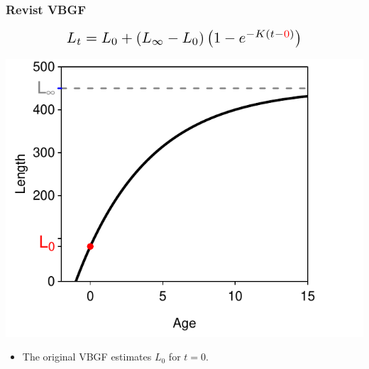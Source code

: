 \documentclass[xcolor=dvipsnames]{beamer}\usepackage[]{graphicx}\usepackage[]{color}
\makeatletter
\newenvironment{knitrout}{}{} %
\newcommand*{\Scale}[2][4]{\scalebox{#1}{\ensuremath{#2}}}%
\def\mathcolor#1#{\@mathcolor{#1}}
\def\@mathcolor#1#2#3{%
  \protect\leavevmode
  \begingroup
    \color#1{#2}#3%
  \endgroup
}
\makeatother
\begin{document}
\begin{frame}
\frametitle{Revist VBGF}
\vspace{-14pt}
\[\Scale[1.5]{ L_{t} = L_{0} + (L_{\infty}-L_{0})\left(1-e^{-K(t-\mathcolor{red}{0})}\right) }\]
\vspace{14pt}
\begin{knitrout}\footnotesize
{}\color{fgcolor}

{\centering \includegraphics[width=.5\linewidth]{Figs/redefineC-1} 

}



\end{knitrout}

\begin{itemize}
\item The original VBGF estimates $L_{0}$ for $t=0$.
\end{itemize}
\end{frame}
\end{document}
